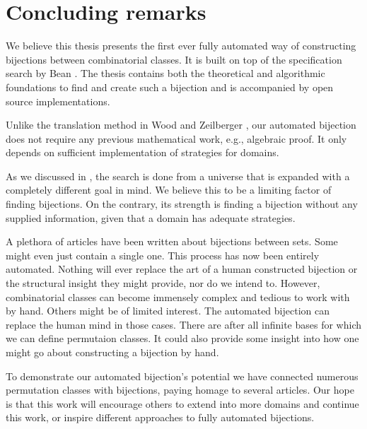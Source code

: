 \section{Concluding remarks}
We believe this thesis presents the first ever fully automated way of constructing bijections between combinatorial classes. It is built on top of the specification search by Bean \cite{BeanPhd:phd}. The thesis contains both the theoretical and algorithmic foundations to find and create such a bijection and is accompanied by open source implementations.

Unlike the translation method in Wood and Zeilberger \cite{wood_zeilberger}, our automated bijection does not require any previous mathematical work, e.g., algebraic proof. It only depends on sufficient implementation of strategies for domains.

As we discussed in , the search is done from a universe that is expanded with a completely different goal in mind. We believe this to be a limiting factor of finding bijections. On the contrary, its strength is finding a bijection without any supplied information, given that a domain has adequate strategies.

A plethora of articles have been written about bijections between sets. Some might even just contain a single one. This process has now been entirely automated. Nothing will ever replace the art of a human constructed bijection or the structural insight they might provide, nor do we intend to. However, combinatorial classes can become immensely complex and tedious to work with by hand. Others might be of limited interest. The automated bijection can replace the human mind in those cases. There are after all infinite bases for which we can define permutaion classes. It could also provide some insight into how one might go about constructing a bijection by hand.

To demonstrate our automated bijection's potential we have connected numerous permutation classes with bijections, paying homage to several articles. Our hope is that this work will encourage others to extend \css{} into more domains and continue this work, or inspire different approaches to fully automated bijections.